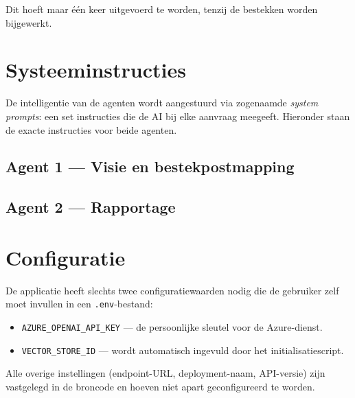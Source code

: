 \documentclass[a4paper,11pt]{article}
\begin{document}
Dit hoeft maar één keer uitgevoerd te worden, tenzij de bestekken worden
bijgewerkt.

\section{Systeeminstructies}

De intelligentie van de agenten wordt aangestuurd via zogenaamde
\emph{system prompts}: een set instructies die de AI bij elke aanvraag
meegeeft. Hieronder staan de exacte instructies voor beide agenten.

\subsection{Agent 1 --- Visie en bestekpostmapping}



\subsection{Agent 2 --- Rapportage}



\section{Configuratie}

De applicatie heeft slechts twee configuratiewaarden nodig die de
gebruiker zelf moet invullen in een \texttt{.env}-bestand:
\begin{itemize}
    \item \texttt{AZURE\_OPENAI\_API\_KEY} --- de persoonlijke sleutel
          voor de Azure-dienst.
    \item \texttt{VECTOR\_STORE\_ID} --- wordt automatisch ingevuld door
          het initialisatiescript.
\end{itemize}

Alle overige instellingen (endpoint-URL, deployment-naam, API-versie)
zijn vastgelegd in de broncode en hoeven niet apart geconfigureerd te
worden.
\end{document}
